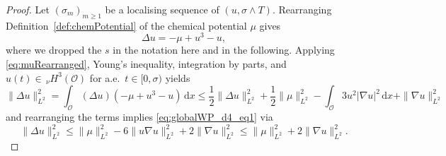 \documentclass[reqno]{amsart}
\newcommand{\sO}{\mathscr{O}}
\newcommand{\1}{\mathbf{1}}
\newcommand{\grad}{\nabla}
\newcommand{\dx}{\,\mathrm{d}x}
\newcommand{\nH}{\ensuremath{\,_\nu H}}
\begin{document}
\begin{proof}
Let $(\sigma_m)_{m\ge 1}$ be a localising sequence of $(u,\sigma\wedge T)$. Rearranging Definition~\ref{def:chemPotential} of the chemical potential $\mu$ gives
\begin{equation}\label{eq:muRearranged}
\Delta u = -\mu + u^3 - u,
\end{equation}
where we dropped the $s$ in the notation here and in the following. 
Applying \eqref{eq:muRearranged}, Young's inequality, integration by parts, and $u(t)\in \nH^3(\sO)$ for a.e.\ $t\in[0,\sigma)$ yields
\begin{equation*}
    \|\Delta u\|_{L^2}^2 
    =\int_{\sO} (\Delta u)(-\mu + u^3 - u) \dx
    \leq \frac12\|\Delta u\|_{L^2}^2 + \frac12\|\mu\|_{L^2}^2 - \int_{\sO} 3u^2|\nabla u|^2 \dx 
    +\|\nabla u\|_{L^2}^2
\end{equation*}
and rearranging the terms implies \eqref{eq:globalWP_d4_eq1} via
\begin{equation*}
    \|\Delta u\|_{L^2}^2
    \le \|\mu\|_{L^2}^2 - 6\|u\nabla u\|_{L^2}^2 + 2\|\nabla u\|_{L^2}^2
    \le \|\mu\|_{L^2}^2 + 2\|\grad u\|_{L^2}^2.
\end{equation*}



\end{proof}
\end{document}
